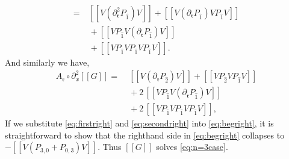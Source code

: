 \documentclass[5p,twocolumn]{elsarticle}
\newcommand*{\pa}{{\partial}}
\newcommand*{\lb}{[\![}
\newcommand*{\rb}{]\!]}
\newcommand*{\rl}{\mathfrak r}
\begin{document}
\begin{example}
\begin{align}
    =&\;\lb V(\pa_\rl^2 P_{\hat{1}})V\rb+\lb V(\pa_{\rl}P_{\hat{1}})VP_{\hat{1}}V\rb\nonumber\\
    &\;+\lb VP_{\hat{1}}V(\pa_{\rl}P_{\hat{1}})V\rb\nonumber\\
    &\;+\lb VP_{\hat{1}}VP_{\hat{1}}VP_{\hat{1}}V\rb.\label{eq:firstright}
  \end{align}
  And similarly we have,
  \begin{align}
    A_{\rl}\circ\pa_x^2\lb G\rb=&\;\lb V(\pa_\rl P_{\hat{2}})V\rb+\lb VP_{\hat{2}}VP_{\hat{1}}V\rb\nonumber\\
    &\;+2\,\lb VP_{\hat{1}}V(\pa_\rl P_{\hat{1}})V\rb\nonumber\\
    &\;+2\,\lb VP_{\hat{1}}VP_{\hat{1}}VP_{\hat{1}}V\rb,\label{eq:secondright}
  \end{align}
  If we substitute \eqref{eq:firstright} and \eqref{eq:secondright} into \eqref{eq:begright},
  it is straightforward to show that the righthand side in \eqref{eq:begright} collapses to $-\lb V(P_{3,0}+P_{0,3})V\rb$. Thus $\lb G\rb$ solves \eqref{eq:n=3case}.
\end{example}
%
\end{document}
